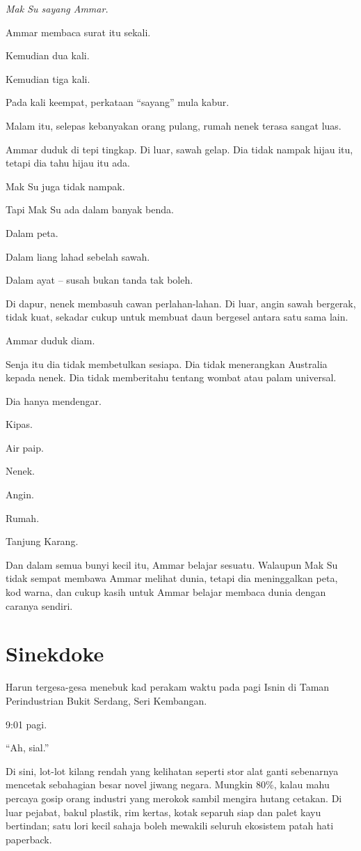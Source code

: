 \documentclass[
  11pt,
  a5paper,
  openany,
  oneside]{book}
\begin{document}
\emph{Mak Su sayang Ammar.}

Ammar membaca surat itu sekali.

Kemudian dua kali.

Kemudian tiga kali.

Pada kali keempat, perkataan ``sayang'' mula kabur.

Malam itu, selepas kebanyakan orang pulang, rumah nenek terasa sangat
luas.

Ammar duduk di tepi tingkap. Di luar, sawah gelap. Dia tidak nampak
hijau itu, tetapi dia tahu hijau itu ada.

Mak Su juga tidak nampak.

Tapi Mak Su ada dalam banyak benda.

Dalam peta.

Dalam liang lahad sebelah sawah.

Dalam ayat -- susah bukan tanda tak boleh.

Di dapur, nenek membasuh cawan perlahan-lahan. Di luar, angin sawah
bergerak, tidak kuat, sekadar cukup untuk membuat daun bergesel antara
satu sama lain.

Ammar duduk diam.

Senja itu dia tidak membetulkan sesiapa. Dia tidak menerangkan Australia
kepada nenek. Dia tidak memberitahu tentang wombat atau palam universal.

Dia hanya mendengar.

Kipas.

Air paip.

Nenek.

Angin.

Rumah.

Tanjung Karang.

Dan dalam semua bunyi kecil itu, Ammar belajar sesuatu. Walaupun Mak Su
tidak sempat membawa Ammar melihat dunia, tetapi dia meninggalkan peta,
kod warna, dan cukup kasih untuk Ammar belajar membaca dunia dengan
caranya sendiri.

\chapter{Sinekdoke}\label{sinekdoke}

Harun tergesa-gesa menebuk kad perakam waktu pada pagi Isnin di Taman
Perindustrian Bukit Serdang, Seri Kembangan.

9:01 pagi.

``Ah, sial.''

Di sini, lot-lot kilang rendah yang kelihatan seperti stor alat ganti
sebenarnya mencetak sebahagian besar novel jiwang negara. Mungkin 80\%,
kalau mahu percaya gosip orang industri yang merokok sambil mengira
hutang cetakan. Di luar pejabat, bakul plastik, rim kertas, kotak
separuh siap dan palet kayu bertindan; satu lori kecil sahaja boleh
mewakili seluruh ekosistem patah hati paperback.
\end{document}
